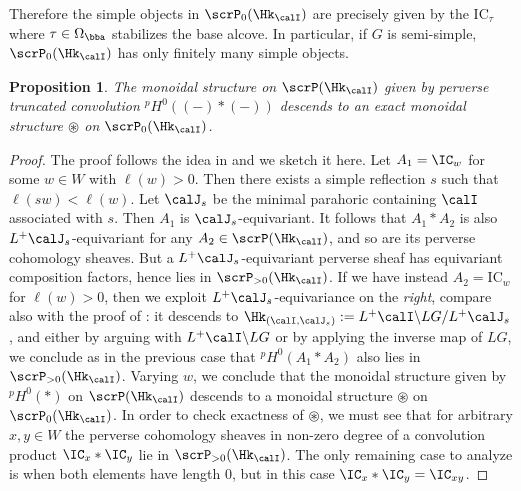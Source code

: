 \documentclass[10pt, reqno]{amsart}
\theoremstyle{plain}
\newtheorem{proposition}[theorem]{Proposition}
\theoremstyle{definition}
\numberwithin{equation}{section}
\begin{document}
Therefore the simple objects in $\scrP_0(\Hk_{\calI})$ are precisely given by the $\mathrm{IC}_\tau$ where $\tau \in \Omega_{\bba}$ stabilizes the base alcove. In particular, if $G$ is semi-simple,  $\scrP_0(\Hk_{\calI})$ has only finitely many simple objects.
\begin{proposition}\label{prop_monoid_perv_reg}
	The monoidal structure on $\scrP(\Hk_{\calI})$ given by perverse truncated convolution $^pH^0((-)\ast(-))$ descends to an exact monoidal structure $\circledast$ on $\scrP_0(\Hk_\calI)$.
\end{proposition}
\begin{proof}
	The proof follows the idea in \cite[Proposition 6.5.14]{AR} and we sketch it here. Let $A_1=\IC_w$ for some $w\in W$ with $\ell(w)> 0$. Then there exists a simple reflection $s$ such that $\ell(sw)<\ell(w)$. Let $\calJ_s$ be the minimal parahoric containing $\calI$ associated with $s$. Then $A_1$ is $\calJ_s$-equivariant. It follows that $A_1\ast A_2$ is also $L^+\calJ_s$-equivariant for any $A_2 \in \scrP(\Hk_{\calI})$, and so are its perverse cohomology sheaves. But a $L^+\calJ_s$-equivariant perverse sheaf has equivariant composition factors, hence lies in $\scrP_{>0}(\Hk_{\calI})$. If we have instead $A_2=\mathrm{IC}_w$ for $\ell(w)>0$, then we exploit $L^+\calJ_s$-equivariance on the {\it right}, compare also with the proof of : it descends to $\Hk_{(\calI,\calJ_s)}:= L^+\calI\backslash LG/L^+\calJ_s$, and either by arguing with $L^+\calI\backslash LG$ or by applying the inverse map of $LG$, we conclude as in the previous case that $^pH^0(A_1 \ast A_2)$ also lies in $\scrP_{>0}(\Hk_{\calI})$.
	Varying $w$, we conclude that the monoidal structure given by $^pH^0(\ast)$ on $\scrP(\Hk_{\calI})$ descends to a monoidal structure $\circledast$ on $\scrP_0(\Hk_{\calI})$. In order to check exactness of $\circledast$, we must see that for arbitrary $x,y \in W$ the perverse cohomology sheaves in non-zero degree of a convolution product $\IC_x\ast \IC_y$  lie in $\scrP_{>0}(\Hk_{\calI})$. The only remaining case to analyze is when
	both elements have length $0$, but in this case $\IC_x\ast \IC_y=\IC_{xy}$.

\end{proof}
\end{document}
